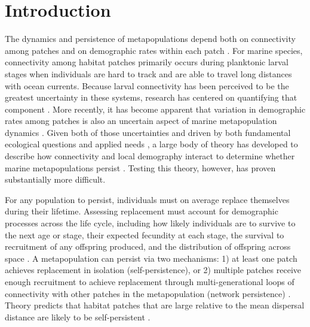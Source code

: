\documentclass[12pt, oneside]{article}   	%
\begin{document}


\section*{Introduction} 

The dynamics and persistence of metapopulations depend both on connectivity among patches and on demographic rates within each patch \citep{hastings_persistence_2006, hanski1998metapopulation}. For marine species, connectivity among habitat patches primarily occurs during planktonic larval stages when individuals are hard to track and are able to travel long distances with ocean currents. Because larval connectivity has been perceived to be the greatest uncertainty in these systems, research has centered on quantifying that component \citep[reviewed by][]{white2019connectivity}. More recently, it has become apparent that variation in demographic rates among patches is also an uncertain aspect of marine metapopulation dynamics \citep{hameed2016inverse, white2011oceanographic}. Given both of those uncertainties and driven by both fundamental ecological questions and applied needs \citep{botsford_dependence_2001,white_population_2010}, a large body of theory has developed to describe how connectivity and local demography interact to determine whether marine metapopulations persist \citep{burgess2014beyond, botsford2019population}. Testing this theory, however, has proven substantially more difficult.

For any population to persist, individuals must on average replace themselves during their lifetime. Assessing replacement must account for demographic processes across the life cycle, including how likely individuals are to survive to the next age or stage, their expected fecundity at each stage, the survival to recruitment of any offspring produced, and the distribution of offspring across space \citep{hastings_persistence_2006}. A metapopulation can persist via two mechanisms: 1) at least one patch achieves replacement in isolation (self-persistence), or 2) multiple patches receive enough recruitment to achieve replacement through multi-generational loops of connectivity with other patches in the metapopulation (network persistence) \citep{hastings_persistence_2006, burgess2014beyond}. Theory predicts that habitat patches that are large relative to the mean dispersal distance are likely to be self-persistent \citep{white_population_2010}. %
\end{document}
